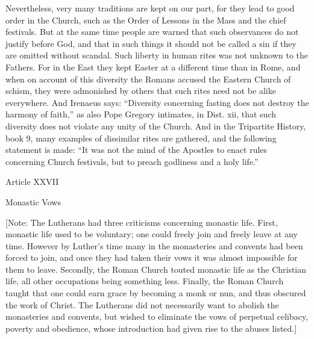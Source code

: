 Nevertheless, very many traditions are kept on our part, for they lead to good order in the Church, such as the Order of Lessons in the Mass and the chief festivals. But at the same time people are warned that such observances do not justify before God, and that in such things it should not be called a sin if they are omitted without scandal. Such liberty in human rites was not unknown to the Fathers. For in the East they kept Easter at a different time than in Rome, and when on account of this diversity the Romans accused the Eastern Church of schism, they were admonished by others that such rites need not be alike everywhere. And Irenaeus says: “Diversity concerning fasting does not destroy the harmony of faith,” as also Pope Gregory intimates, in Dist. xii, that such diversity does not violate any unity of the Church. And in the Tripartite History, book 9, many examples of dissimilar rites are gathered, and the following statement is made: “It was not the mind of the Apostles to enact rules concerning Church festivals, but to preach godliness and a holy life.”

 

Article XXVII

Monastic Vows

[Note: The Lutherans had three criticisms concerning monastic life. First, monastic life used to be voluntary; one could freely join and freely leave at any time. However by Luther’s time many in the monasteries and convents had been forced to join, and once they had taken their vows it was almost impossible for them to leave. Secondly, the Roman Church touted monastic life as the Christian life, all other occupations being something less. Finally, the Roman Church taught that one could earn grace by becoming a monk or nun, and thus obscured the work of Christ. The Lutherans did not necessarily want to abolish the monasteries and convents, but wished to eliminate the vows of perpetual celibacy, poverty and obedience, whose introduction had given rise to the abuses listed.]

